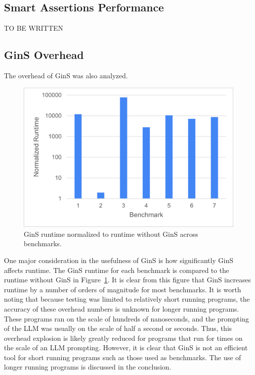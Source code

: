 \documentclass[sigconf]{acmart}
\begin{document}
\subsection{Smart Assertions Performance}
TO BE WRITTEN

\subsection{GinS Overhead}
The overhead of GinS was also analyzed.
\begin{figure}
    \centering
    \includegraphics[width=0.8\linewidth]{images/Time.png}
    \caption{GinS runtime normalized to runtime without GinS across benchmarks.}
    \label{fig:time}
\end{figure}

One major consideration in the usefulness of GinS is how significantly GinS affects runtime.
The GinS runtime for each benchmark is compared to the runtime without GinS in Figure~\ref{fig:time}.
It is clear from this figure that GinS increases runtime by a number of orders of magnitude for most benchmarks.
It is worth noting that because testing was limited to relatively short running programs, the accuracy of these overhead numbers is unknown for longer running programs.
These programs ran on the scale of hundreds of nanoseconds, and the prompting of the LLM was usually on the scale of half a second or seconds.
Thus, this overhead explosion is likely greatly reduced for programs that run for times on the scale of an LLM prompting.
However, it is clear that GinS is not an efficient tool for short running programs such as those used as benchmarks.
The use of longer running programs is discussed in the conclusion.
\end{document}
